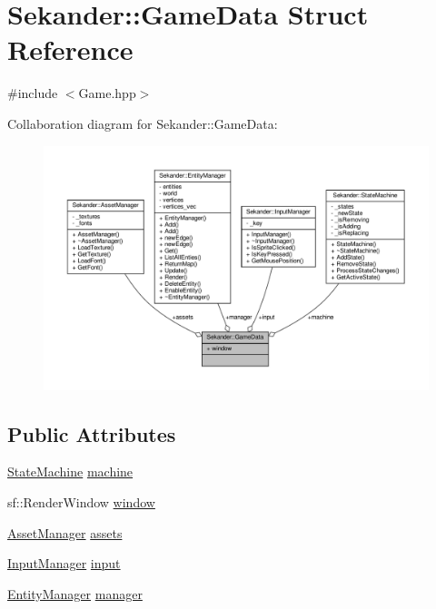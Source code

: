 \hypertarget{structSekander_1_1GameData}{}\section{Sekander\+:\+:Game\+Data Struct Reference}
\label{structSekander_1_1GameData}


{\ttfamily \#include $<$Game.\+hpp$>$}



Collaboration diagram for Sekander\+:\+:Game\+Data\+:
\nopagebreak
\begin{figure}[H]
\begin{center}
\leavevmode
\includegraphics[width=350pt]{structSekander_1_1GameData__coll__graph}
\end{center}
\end{figure}
\subsection*{Public Attributes}
\begin{DoxyCompactItemize}
\item 
\hyperlink{classSekander_1_1StateMachine}{State\+Machine} \hyperlink{structSekander_1_1GameData_a6f701ff9c5018ee293869248798f02a4}{machine}
\item 
sf\+::\+Render\+Window \hyperlink{structSekander_1_1GameData_a01dc93a762f8235e2e95eb2c79fa25fc}{window}
\item 
\hyperlink{classSekander_1_1AssetManager}{Asset\+Manager} \hyperlink{structSekander_1_1GameData_a2540773e72a9b18686041a4b626fd90f}{assets}
\item 
\hyperlink{classSekander_1_1InputManager}{Input\+Manager} \hyperlink{structSekander_1_1GameData_afe024ef371741c95bad3abaf8ddeebf1}{input}
\item 
\hyperlink{classSekander_1_1EntityManager}{Entity\+Manager} \hyperlink{structSekander_1_1GameData_a5d4bea0451d09e81fee2b4c38c2b6ca5}{manager}
\end{DoxyCompactItemize}


